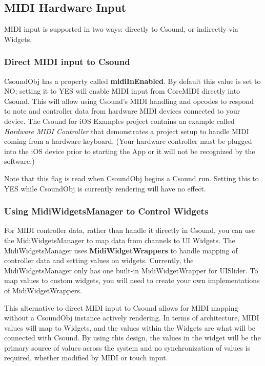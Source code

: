 \documentclass[11pt]{article}
\begin{document}
\subsection{MIDI Hardware Input}

MIDI input is supported in two ways: directly to Csound, or indirectly via Widgets.

\subsubsection{Direct MIDI input to Csound}

CsoundObj has a property called \textbf{midiInEnabled}.  By default this value is set to NO; setting it to YES will enable MIDI input from CoreMIDI directly into Csound. This will allow using Csound's MIDI handling and opcodes to respond to note and controller data from hardware MIDI devices connected to your device.  The Csound for iOS Examples project contains an example called \emph{Hardware MIDI Controller} that demonstrates a project setup to handle MIDI coming from a hardware keyboard.  (Your hardware controller must be plugged into the iOS device prior to starting the App or it will not be recognized by the software.)

Note that this flag is read when CsoundObj begins a Csound run.  Setting this to YES while CsoundObj is currently rendering will have no effect.

\subsubsection{Using MidiWidgetsManager to Control Widgets}

For MIDI controller data, rather than handle it directly in Csound, you can use the MidiWidgetsManager to map data from channels to UI Widgets.  The MidiWidgetsManager uses \textbf{MidiWidgetWrappers} to handle mapping of controller data and setting values on widgets.  Currently, the MidiWidgetsManager only has one built-in MidiWidgetWrapper for UISlider. To map values to custom widgets, you will need to create your own implementations of MidiWidgetWrappers.

This alternative to direct MIDI input to Csound allows for MIDI mapping without a CsoundObj instance actively rendering. In terms of architecture, MIDI values will map to Widgets, and the values within the Widgets are what will be connected with Csound.  By using this design, the values in the widget will be the primary source of values across the system and no synchronization of values is required, whether modified by MIDI or touch input.
\end{document}
